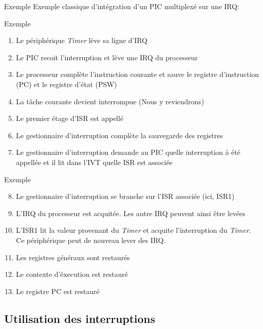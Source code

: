 \begin{frame}{Exemple}
  Exemple classique d'intégration d'un PIC multiplexé sur une IRQ:
  \begin{center}
  \end{center}
\end{frame} 

\begin{frame}{Exemple}
  \begin{enumerate}
  \item Le périphérique \emph{Timer} lève sa ligne d'IRQ
  \item Le PIC recoit l'interruption et lève une IRQ du processeur
  \item  Le processeur  complète  l'instruction courante  et sauve  le
    registre d'instruction (PC) et le registre d'état (PSW)
  \item La tâche courante devient interrompue (Nous y reviendrons)
  \item Le premier étage d'ISR est appellé
  \item  Le  gestionnaire d'interruption  complète  la sauvegarde  des
    registres
  \item   Le  gestionnaire  d'interruption   demande  au   PIC  quelle
    interruption à  été appellée et il  lit dans l'IVT  quelle ISR est
    associée
  \end{enumerate}
\end{frame}

\begin{frame}{Exemple}
  \begin{enumerate}
    \setcounter{enumi}{7}
  \item Le  gestionnaire d'interruption se branche  sur l'ISR associée
    (ici, ISR1)
  \item L'IRQ du processeur est  acquitée. Les autre IRQ peuvent ainsi
    être levées
  \item L'ISR1 lit la  valeur provenant du \emph{Timer} et acquite
    l'interruption  du \emph{Timer}. Ce  périphérique peut  de nouveau
    lever des IRQ.
  \item Les registres généraux sont restaurés
  \item Le contexte d'éxecution est restauré
  \item Le registre PC est restauré
  \end{enumerate}
\end{frame} 

\subsection{Utilisation des interruptions}

